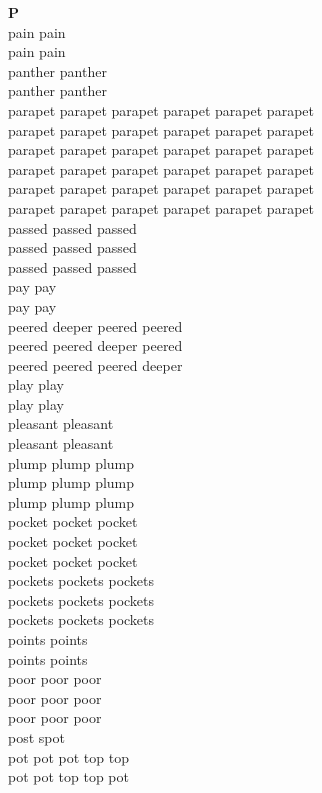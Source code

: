 \vspace{14pt}
\noindent\textbf{\Large P}\\[+12pt]
pain pain\\
pain pain\\
panther panther\\
panther panther\\
parapet parapet parapet parapet parapet parapet\\
parapet parapet parapet parapet parapet parapet\\
parapet parapet parapet parapet parapet parapet\\
parapet parapet parapet parapet parapet parapet\\
parapet parapet parapet parapet parapet parapet\\
parapet parapet parapet parapet parapet parapet\\
passed passed passed\\
passed passed passed\\
passed passed passed\\
pay pay\\
pay pay\\
peered deeper peered peered\\
peered peered deeper peered\\
peered peered peered deeper\\
play play\\
play play\\
pleasant pleasant\\
pleasant pleasant\\
plump plump plump\\
plump plump plump\\
plump plump plump\\
pocket pocket pocket\\
pocket pocket pocket\\
pocket pocket pocket\\
pockets pockets pockets\\
pockets pockets pockets\\
pockets pockets pockets\\
points points\\
points points\\
poor poor poor\\
poor poor poor\\
poor poor poor\\
post spot\\
pot pot pot top top\\
pot pot top top pot\\

